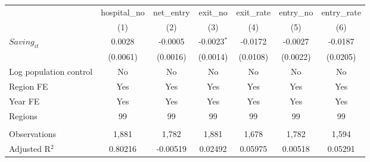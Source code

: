 \begingroup
\centering
\begin{tabular}{lcccccc}
   \toprule
                          & hospital\_no  & net\_entry  & exit\_no      & exit\_rate  & entry\_no  & entry\_rate \\    
                          & (1)           & (2)         & (3)           & (4)         & (5)        & (6)\\  
   \midrule 
   $Saving_{it}$          & 0.0028        & -0.0005     & -0.0023$^{*}$ & -0.0172     & -0.0027    & -0.0187\\   
                          & (0.0061)      & (0.0016)    & (0.0014)      & (0.0108)    & (0.0022)   & (0.0205)\\   
   Log population control & No            & No          & No            & No          & No         & No\\  
   Region FE              & Yes           & Yes         & Yes           & Yes         & Yes        & Yes\\  
   Year FE                & Yes           & Yes         & Yes           & Yes         & Yes        & Yes\\  
   Regions                & 99            & 99          & 99            & 99          & 99         & 99\\  
    \\
   Observations           & 1,881         & 1,782       & 1,881         & 1,678       & 1,782      & 1,594\\  
   Adjusted R$^2$         & 0.80216       & -0.00519    & 0.02492       & 0.05975     & 0.00518    & 0.05291\\  
   \bottomrule
\end{tabular}
\par\endgroup
